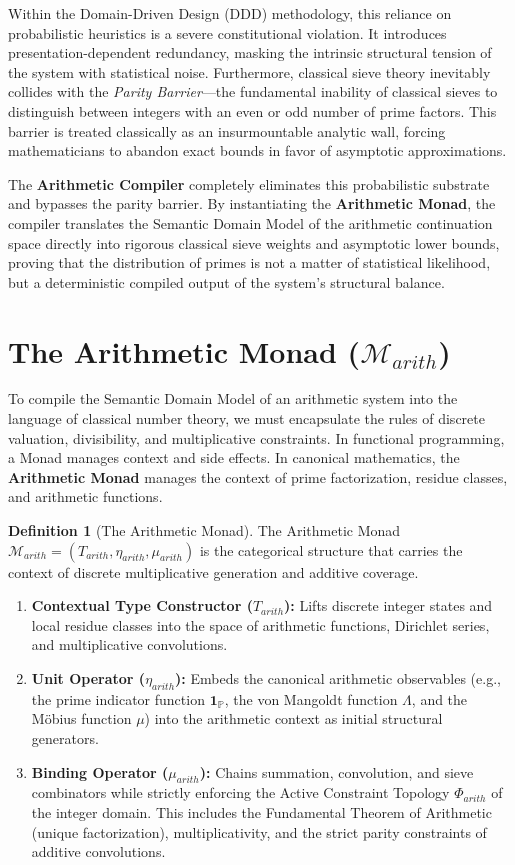 \documentclass[12pt,openany]{extbook}
\theoremstyle{plain}
\theoremstyle{definition}
\newtheorem{definition}{Definition}[chapter]
\begin{document}
Within the Domain-Driven Design (DDD) methodology, this reliance on probabilistic heuristics is a severe constitutional violation. It introduces presentation-dependent redundancy, masking the intrinsic structural tension of the system with statistical noise. Furthermore, classical sieve theory inevitably collides with the \emph{Parity Barrier}---the fundamental inability of classical sieves to distinguish between integers with an even or odd number of prime factors. This barrier is treated classically as an insurmountable analytic wall, forcing mathematicians to abandon exact bounds in favor of asymptotic approximations.

The \textbf{Arithmetic Compiler} completely eliminates this probabilistic substrate and bypasses the parity barrier. By instantiating the \textbf{Arithmetic Monad}, the compiler translates the Semantic Domain Model of the arithmetic continuation space directly into rigorous classical sieve weights and asymptotic lower bounds, proving that the distribution of primes is not a matter of statistical likelihood, but a deterministic compiled output of the system's structural balance.

\section{The Arithmetic Monad ($\mathcal{M}_{arith}$)}

To compile the Semantic Domain Model of an arithmetic system into the language of classical number theory, we must encapsulate the rules of discrete valuation, divisibility, and multiplicative constraints. In functional programming, a Monad manages context and side effects. In canonical mathematics, the \textbf{Arithmetic Monad} manages the context of prime factorization, residue classes, and arithmetic functions.

\begin{definition}[The Arithmetic Monad]
The Arithmetic Monad $\mathcal{M}_{arith} = (T_{arith}, \eta_{arith}, \mu_{arith})$ is the categorical structure that carries the context of discrete multiplicative generation and additive coverage.
\begin{enumerate}
    \item \textbf{Contextual Type Constructor ($T_{arith}$):} Lifts discrete integer states and local residue classes into the space of arithmetic functions, Dirichlet series, and multiplicative convolutions.
    \item \textbf{Unit Operator ($\eta_{arith}$):} Embeds the canonical arithmetic observables (e.g., the prime indicator function $\mathbf{1}_{\mathbb{P}}$, the von Mangoldt function $\Lambda$, and the M\"{o}bius function $\mu$) into the arithmetic context as initial structural generators.
    \item \textbf{Binding Operator ($\mu_{arith}$):} Chains summation, convolution, and sieve combinators while strictly enforcing the Active Constraint Topology $\Phi_{arith}$ of the integer domain. This includes the Fundamental Theorem of Arithmetic (unique factorization), multiplicativity, and the strict parity constraints of additive convolutions.
\end{enumerate}
\end{definition}
\end{document}
